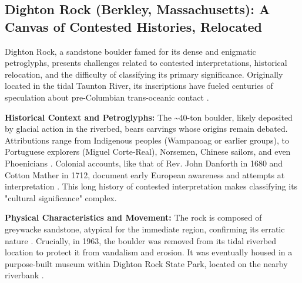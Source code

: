 \documentclass[
11pt, %
english, %
singlespacing, %
headsepline, %
]{MastersDoctoralThesis} %
\begin{document}
\subsection{Dighton Rock (Berkley, Massachusetts): A Canvas of Contested Histories, Relocated}
\label{subsec:dighton}

Dighton Rock, a sandstone boulder famed for its dense and enigmatic petroglyphs, presents challenges related to contested interpretations, historical relocation, and the difficulty of classifying its primary significance. Originally located in the tidal Taunton River, its inscriptions have fueled centuries of speculation about pre-Columbian trans-oceanic contact \cite{Lenik2009, Delabarre1928}.

\textbf{Historical Context and Petroglyphs:} The \textasciitilde40-ton boulder, likely deposited by glacial action in the riverbed, bears carvings whose origins remain debated. Attributions range from Indigenous peoples (Wampanoag or earlier groups), to Portuguese explorers (Miguel Corte-Real), Norsemen, Chinese sailors, and even Phoenicians \cite{Lenik2009, Pohl1950}. Colonial accounts, like that of Rev. John Danforth in 1680 and Cotton Mather in 1712, document early European awareness and attempts at interpretation \cite{Lenik2009, Delabarre1928}. This long history of contested interpretation makes classifying its "cultural significance" complex.

\textbf{Physical Characteristics and Movement:} The rock is composed of greywacke sandstone, atypical for the immediate region, confirming its erratic nature \cite{Delabarre1928}. Crucially, in 1963, the boulder was removed from its tidal riverbed location to protect it from vandalism and erosion. It was eventually housed in a purpose-built museum within Dighton Rock State Park, located on the nearby riverbank \cite{Lenik2009, MassDCRDighton}.
\end{document}
